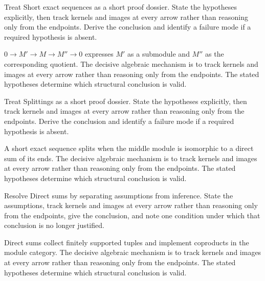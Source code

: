 \begin{problem}\label{prob:v09-problem-05}
Treat Short exact sequences as a short proof dossier. State the hypotheses explicitly, then track kernels and images at every arrow rather than reasoning only from the endpoints. Derive the conclusion and identify a failure mode if a required hypothesis is absent.
\end{problem}
\begin{solution}
$0\to M'\to M\to M''\to0$ expresses $M'$ as a submodule and $M''$ as the corresponding quotient. The decisive algebraic mechanism is to track kernels and images at every arrow rather than reasoning only from the endpoints. The stated hypotheses determine which structural conclusion is valid.
\end{solution}

\begin{problem}\label{prob:v09-problem-06}
Treat Splittings as a short proof dossier. State the hypotheses explicitly, then track kernels and images at every arrow rather than reasoning only from the endpoints. Derive the conclusion and identify a failure mode if a required hypothesis is absent.
\end{problem}
\begin{solution}
A short exact sequence splits when the middle module is isomorphic to a direct sum of its ends. The decisive algebraic mechanism is to track kernels and images at every arrow rather than reasoning only from the endpoints. The stated hypotheses determine which structural conclusion is valid.
\end{solution}

\begin{problem}\label{prob:v09-problem-07}
Resolve Direct sums by separating assumptions from inference. State the assumptions, track kernels and images at every arrow rather than reasoning only from the endpoints, give the conclusion, and note one condition under which that conclusion is no longer justified.
\end{problem}
\begin{solution}
Direct sums collect finitely supported tuples and implement coproducts in the module category. The decisive algebraic mechanism is to track kernels and images at every arrow rather than reasoning only from the endpoints. The stated hypotheses determine which structural conclusion is valid.
\end{solution}

